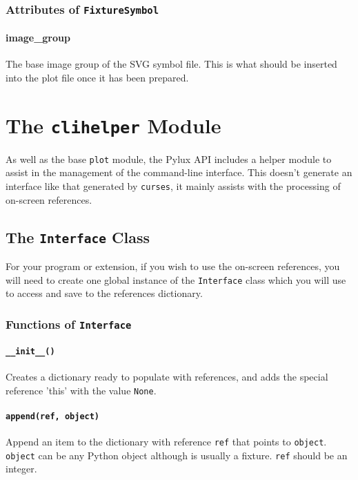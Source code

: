 \documentclass[a4paper]{article}
\begin{document}
\subsubsection{Attributes of \texttt{FixtureSymbol}}

\paragraph{image\_group}
The base image group of the SVG symbol file. This is what should be inserted 
into the plot file once it has been prepared.

\section{The \texttt{clihelper} Module}
As well as the base \texttt{plot} module, the Pylux API includes a helper 
module to assist in the management of the command-line interface. This doesn't 
generate an interface like that generated by \texttt{curses}, it mainly 
assists with the processing of on-screen references.

\subsection{The \texttt{Interface} Class}
For your program or extension, if you wish to use the on-screen references, 
you will need to create one global instance of the \texttt{Interface} class 
which you will use to access and save to the references dictionary.

\subsubsection{Functions of \texttt{Interface}}

\paragraph{\texttt{\_\_init\_\_()}}
Creates a dictionary ready to populate with references, and adds the special 
reference 'this' with the value \texttt{None}.

\paragraph{\texttt{append(ref, object)}}
Append an item to the dictionary with reference \texttt{ref} that points to 
\texttt{object}. \texttt{object} can be any Python object although is usually 
a fixture. \texttt{ref} should be an integer.
\end{document}
